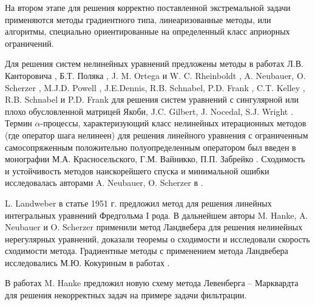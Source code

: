 {На втором этапе для решения корректно поставленной экстремальной задачи применяются методы градиентного типа, линеаризованные методы, или алгоритмы, специально ориентированные на определенный класс априорных ограничений.

Для решения систем нелинейных уравнений предложены методы в работах Л.В. Канторовича \cite{Kan1947}, Б.Т. Поляка \cite{Pol1969}, J. M. Ortega и W. C. Rheinboldt \cite{OrtRhe1970}, A. Neubauer, O. Scherzer \cite{NeuSch1995, Sch1995}, M.J.D. Powell \cite{Pow1970}, J.E.Dennis, R.B. Schnabel, P.D. Frank \cite{DenSchn1996}, C.T. Kelley \cite{Kel1995}, R.B. Schnabel и P.D. Frank \cite{SchnFra1983} для решения систем уравнений с сингулярной или плохо обусловленной матрицей Якоби, J.C. Gilbert, J. Nocedal, S.J. Wright \cite{GilNoc1991, NocWri2006}. Термин $\alpha$-процессы, характеризующий класс нелинейных итерационных методов (где оператор шага нелинеен) для решения линейного уравнения с ограниченным самосопряженным положительно полуопределенным оператором был введен в монографии М.А. Красносельского, Г.М. Вайникко, П.П. Забрейко \cite{KraVayZab1969}. Сходимость и устойчивость методов наискорейшего спуска и минимальной ошибки исследовалась авторами A. Neubauer, O. Scherzer в \cite{NeuSch1995}.

L. Landweber в статье \cite{Lan1951} 1951 г. предложил метод для решения линейных интегральных уравнений Фредгольма I рода. В дальнейшем авторы M. Hanke, A. Neubauer и O. Scherzer \cite{HanNeuSch1995,Neu2000,NeuSch1995} применили метод Ландвебера для решения нелинейных нерегулярных уравнений, доказали теоремы о сходимости и исследовали скорость сходимости метода. Градиентные методы с применением метода Ландвебера исследовались М.Ю. Кокуриным в работах \cite{Kok2010_1,Kok2010_2}.

В работах \cite{Han1997,Han2010} M. Hanke предложил новую схему метода Левенберга -- Марквардта для решения некорректных задач на примере задачи фильтрации.

}
